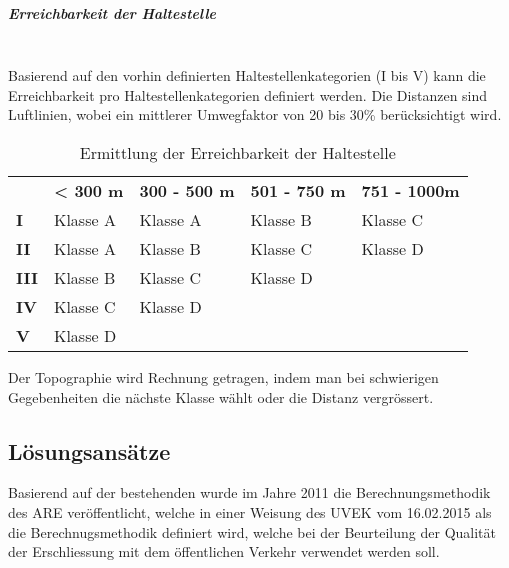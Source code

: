 \subparagraph{Erreichbarkeit der Haltestelle}~\\
\label{Definition ÖV-Güteklassen:Erreichbarkeit der Haltestelle}
Basierend auf den vorhin definierten Haltestellenkategorien (I bis V) kann die Erreichbarkeit pro Haltestellenkategorien definiert werden.
Die Distanzen sind Luftlinien, wobei ein mittlerer Umwegfaktor von 20 bis 30\% berücksichtigt wird.

\begin{table}[ht]
    \begin{tabular}[c]{l p{3.3cm} p{3.3cm} p{3.3cm} p{3.3cm}}
        \midrule
        \textbf{}
                                & \textbf{< 300 m}
                                & \textbf{300 - 500 m}
                                & \textbf{501 - 750 m}
                                & \textbf{751 - 1000m}\\
        \textbf{I}
                                & Klasse A
                                & Klasse A
                                & Klasse B
                                & Klasse C\\
        \textbf{II}
                                & Klasse A
                                & Klasse B
                                & Klasse C
                                & Klasse D\\
        \textbf{III}
                                & Klasse B
                                & Klasse C
                                & Klasse D
                                &\\
        \textbf{IV}
                                & Klasse C
                                & Klasse D
                                &
                                &\\
        \textbf{V}
                                & Klasse D
                                &
                                &
                                &\\
        \bottomrule
    \end{tabular}
    \caption{Ermittlung der Erreichbarkeit der Haltestelle}
    \label{table:Ermittlung Erreichbarkeit der Haltestelle}
\end{table}

Der Topographie wird Rechnung getragen, indem man bei schwierigen Gegebenheiten die nächste Klasse wählt oder die Distanz vergrössert.

\subsection{Lösungsansätze}
\label{Stand der Technik:Lösungsansätze}
Basierend auf der bestehenden  wurde im Jahre 2011 die Berechnungsmethodik des \ac{ARE} veröffentlicht, welche in einer Weisung des \acs{UVEK} vom 16.02.2015 als die Berechnugsmethodik definiert wird, welche bei der Beurteilung der Qualität der Erschliessung mit dem öffentlichen Verkehr verwendet werden soll.

